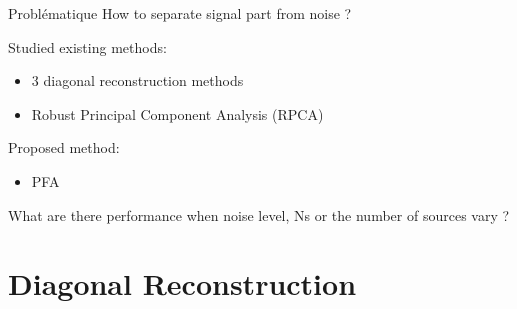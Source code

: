 \documentclass[9pt,xcolor=x11names,compress, notes=show]{beamer}%
\begin{document}
\begin{frame}{Problématique}
	How to separate signal part from noise ? 
	
	Studied existing methods:
	\begin{itemize}
	        \item 	3 diagonal reconstruction methods
        		\item Robust Principal Component Analysis (RPCA)
	\end{itemize}
	
	Proposed method:
	\begin{itemize}
        \item PFA
\end{itemize}
	
	What are there performance when noise level, Ns or the  number of sources vary ?

\end{frame}


\section{Diagonal Reconstruction}
\begin{frame}
\tableofcontents[hideallsubsections]
\end{frame}
\begin{frame}
\end{frame}
\end{document}
